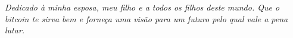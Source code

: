 
\newpage \vspace*{8cm}
\thispagestyle{empty}
\begin{center}
  \Large \emph{
  Dedicado à minha esposa, meu filho e a todos os filhos deste mundo. Que o bitcoin te sirva bem e forneça uma visão para um futuro pelo qual vale a pena lutar.
  }
\end{center}
